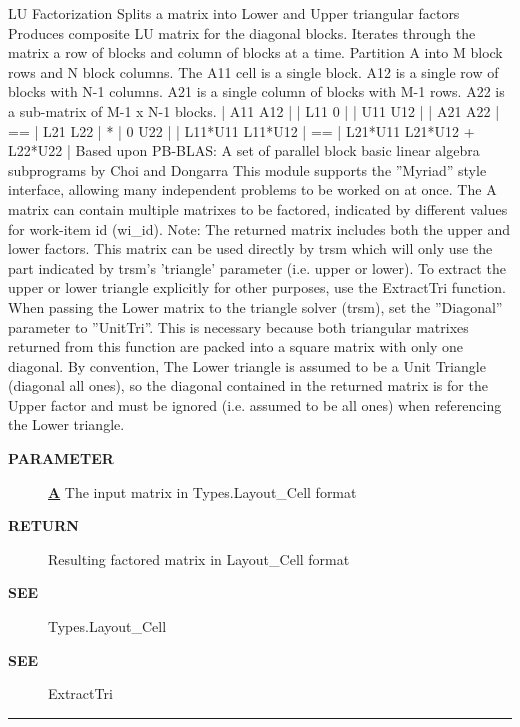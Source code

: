 \par
LU Factorization Splits a matrix into Lower and Upper triangular factors Produces composite LU matrix for the diagonal blocks. Iterates through the matrix a row of blocks and column of blocks at a time. Partition A into M block rows and N block columns. The A11 cell is a single block. A12 is a single row of blocks with N-1 columns. A21 is a single column of blocks with M-1 rows. A22 is a sub-matrix of M-1 x N-1 blocks. | A11 A12 | | L11 0 | | U11 U12 | | A21 A22 | == | L21 L22 | * | 0 U22 | | L11*U11 L11*U12 | == | L21*U11 L21*U12 + L22*U22 | Based upon PB-BLAS: A set of parallel block basic linear algebra subprograms by Choi and Dongarra This module supports the ''Myriad'' style interface, allowing many independent problems to be worked on at once. The A matrix can contain multiple matrixes to be factored, indicated by different values for work-item id (wi\_id). Note: The returned matrix includes both the upper and lower factors. This matrix can be used directly by trsm which will only use the part indicated by trsm's 'triangle' parameter (i.e. upper or lower). To extract the upper or lower triangle explicitly for other purposes, use the ExtractTri function. When passing the Lower matrix to the triangle solver (trsm), set the ''Diagonal'' parameter to ''UnitTri''. This is necessary because both triangular matrixes returned from this function are packed into a square matrix with only one diagonal. By convention, The Lower triangle is assumed to be a Unit Triangle (diagonal all ones), so the diagonal contained in the returned matrix is for the Upper factor and must be ignored (i.e. assumed to be all ones) when referencing the Lower triangle.

\par
\begin{description}
\item [\colorbox{tagtype}{\color{white} \textbf{\textsf{PARAMETER}}}] \textbf{\underline{A}} The input matrix in Types.Layout\_Cell format
\item [\colorbox{tagtype}{\color{white} \textbf{\textsf{RETURN}}}] \textbf{\underline{}} Resulting factored matrix in Layout\_Cell format
\item [\colorbox{tagtype}{\color{white} \textbf{\textsf{SEE}}}] \textbf{\underline{}} Types.Layout\_Cell
\item [\colorbox{tagtype}{\color{white} \textbf{\textsf{SEE}}}] \textbf{\underline{}} ExtractTri
\end{description}

\rule{\linewidth}{0.5pt}
